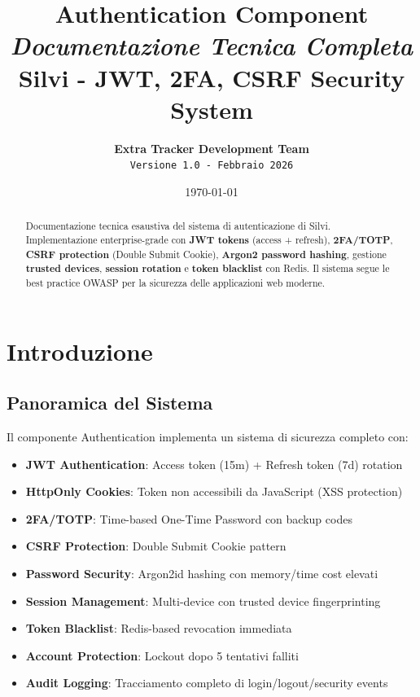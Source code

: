 \documentclass[11pt,a4paper]{article}
\title{
    \Huge\textbf{Authentication Component}\\[0.5em]
    \Large\textit{Documentazione Tecnica Completa}\\[1em]
    \large Silvi - JWT, 2FA, CSRF Security System
}
\author{
    \textbf{Extra Tracker Development Team}\\
    \texttt{Versione 1.0 - Febbraio 2026}
}
\date{\today}
\begin{document}
\maketitle
\thispagestyle{empty}

\vfill

\begin{abstract}
\noindent
Documentazione tecnica esaustiva del sistema di autenticazione di Silvi. Implementazione enterprise-grade con \textbf{JWT tokens} (access + refresh), \textbf{2FA/TOTP}, \textbf{CSRF protection} (Double Submit Cookie), \textbf{Argon2 password hashing}, gestione \textbf{trusted devices}, \textbf{session rotation} e \textbf{token blacklist} con Redis. Il sistema segue le best practice OWASP per la sicurezza delle applicazioni web moderne.
\end{abstract}

\vfill
\newpage

\tableofcontents
\newpage

\section{Introduzione}\label{sec:intro}

\subsection{Panoramica del Sistema}

Il componente Authentication implementa un sistema di sicurezza completo con:

\begin{itemize}[leftmargin=*]
    \item \textbf{JWT Authentication}: Access token (15m) + Refresh token (7d) rotation
    \item \textbf{HttpOnly Cookies}: Token non accessibili da JavaScript (XSS protection)
    \item \textbf{2FA/TOTP}: Time-based One-Time Password con backup codes
    \item \textbf{CSRF Protection}: Double Submit Cookie pattern
    \item \textbf{Password Security}: Argon2id hashing con memory/time cost elevati
    \item \textbf{Session Management}: Multi-device con trusted device fingerprinting
    \item \textbf{Token Blacklist}: Redis-based revocation immediata
    \item \textbf{Account Protection}: Lockout dopo 5 tentativi falliti
    \item \textbf{Audit Logging}: Tracciamento completo di login/logout/security events
\end{itemize}
\end{document}
